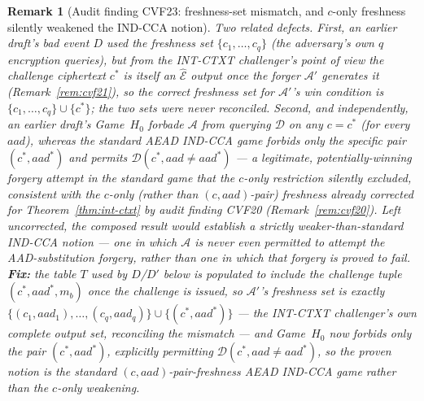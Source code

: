 \documentclass[11pt,a4paper]{article}
\newtheorem{remark}[theorem]{Remark}
\begin{document}
\begin{remark}[Audit finding CVF23: freshness-set mismatch, and $c$-only freshness silently weakened the IND-CCA notion]
\label{rem:cvf23}
Two related defects. First, an earlier draft's bad event $D$ used the
freshness set $\{c_1,\ldots,c_q\}$ (the adversary's own $q$ encryption
queries), but from the INT-CTXT challenger's point of view the challenge
ciphertext $c^*$ is itself an $\hat{\mathcal{E}}$ output once the forger
$\mathcal{A}'$ generates it (Remark~\ref{rem:cvf21}), so the correct
freshness set for $\mathcal{A}'$'s win condition is
$\{c_1,\ldots,c_q\}\cup\{c^*\}$; the two sets were never reconciled.
Second, and independently, an earlier draft's Game~$H_0$ forbade
$\mathcal{A}$ from querying $\mathcal{D}$ on \emph{any} $c=c^*$ (for every
$aad$), whereas the standard AEAD IND-CCA game forbids only the specific
pair $(c^*,aad^*)$ and \emph{permits} $\mathcal{D}(c^*,aad\neq aad^*)$ ---
a legitimate, potentially-winning forgery attempt in the standard game
that the $c$-only restriction silently excluded, consistent with the
$c$-only (rather than $(c,aad)$-pair) freshness already corrected for
Theorem~\ref{thm:int-ctxt} by audit finding CVF20
(Remark~\ref{rem:cvf20}). Left uncorrected, the composed result would
establish a strictly weaker-than-standard IND-CCA notion --- one in which
$\mathcal{A}$ is never even permitted to \emph{attempt} the
AAD-substitution forgery, rather than one in which that forgery is proved
to fail. \textbf{Fix:} the table $T$ used by $D$/$D'$ below is populated
to include the challenge tuple $(c^*,aad^*,m_b)$ once the challenge is
issued, so $\mathcal{A}'$'s freshness set is exactly
$\{(c_1,aad_1),\ldots,(c_q,aad_q)\}\cup\{(c^*,aad^*)\}$ --- the INT-CTXT
challenger's own complete output set, reconciling the mismatch --- and
Game~$H_0$ now forbids only the pair $(c^*,aad^*)$, explicitly permitting
$\mathcal{D}(c^*,aad\neq aad^*)$, so the proven notion is the standard
$(c,aad)$-pair-freshness AEAD IND-CCA game rather than the $c$-only
weakening.
\end{remark}
\end{document}
